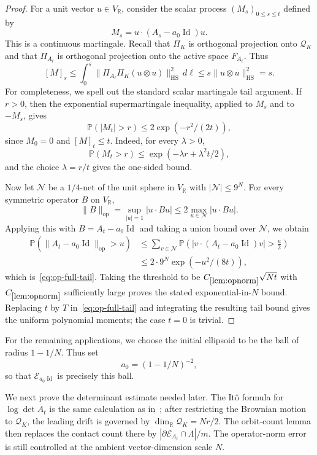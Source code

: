 \documentclass[11pt]{article}
\theoremstyle{remark}
\newcommand{\R}{\mathbb R}
\newcommand{\Id}{\operatorname{Id}}
\newcommand{\Prob}{\mathbb P}
\newcommand{\HS}{\operatorname{HS}}
\newcommand{\op}{\operatorname{op}}
\newcommand{\calE}{\mathcal E}
\begin{document}
\begin{proof}
For a unit vector $u\in V_\R$, consider the scalar process
$(M_s)_{0\le s\le t}$ defined by
\[
        M_s=u\cdot(A_s-a_0\Id)u.
\]
This is a continuous martingale.  Recall that $\Pi_K$ is orthogonal
projection onto $\mathcal Q_K$ and that $\Pi_{A_\ell}$ is orthogonal
projection onto the active space
$F_{A_\ell}$.  Thus
\[
        [M]_s
        \le \int_0^s\|\Pi_{A_\ell}\Pi_K(u\otimes u)\|_{\HS}^2\,d\ell
        \le s\|u\otimes u\|_{\HS}^2=s.
\]
For completeness, we spell out the standard scalar martingale tail argument.
If $r>0$, then the exponential supermartingale inequality, applied to $M_s$
and to $-M_s$, gives
\[
        \Prob(|M_t|>r)
        \le 2\exp\left(-r^2/(2t)\right),
\]
since $M_0=0$ and $[M]_t\le t$.  Indeed, for every $\lambda>0$,
\[
        \Prob(M_t>r)
        \le \exp\left(-\lambda r+\lambda^2t/2\right),
\]
and the choice $\lambda=r/t$ gives the one-sided bound.

Now let $\mathcal N$ be a $1/4$-net of the unit sphere in $V_\R$ with
$|\mathcal N|\le 9^N$.  For every symmetric operator $B$ on $V_\R$,
\[
        \|B\|_{\op}
        =\sup_{|u|=1}|u\cdot Bu|
        \le 2\max_{u\in\mathcal N}|u\cdot Bu|.
\]
Applying this with $B=A_t-a_0\Id$ and taking a union bound over $\mathcal N$,
we obtain
\[
\begin{aligned}
        \Prob\left(\|A_t-a_0\Id\|_{\op}>u\right)
        &\le
        \sum_{v\in\mathcal N}
        \Prob\left(\left|v\cdot(A_t-a_0\Id)v\right|>\frac{u}{2}\right) \\
        &\le 2\cdot 9^N
        \exp\left(-u^2/(8t)\right),
\end{aligned}
\]
which is~\eqref{eq:op-full-tail}.
Taking the threshold to be $C_{\ref{lem:opnorm}}\sqrt{Nt}$ with
$C_{\ref{lem:opnorm}}$ sufficiently large proves the stated
exponential-in-$N$ bound.  Replacing $t$ by $T$
in~\eqref{eq:op-full-tail} and integrating the resulting tail bound gives the
uniform polynomial moments; the case $t=0$ is trivial.
\end{proof}

For the remaining applications, we choose the initial ellipsoid to be the ball
of radius $1-1/N$.  Thus set
\begin{equation}
        a_0=(1-1/N)^{-2},
\label{eq:a0}
\end{equation}
so that $\calE_{a_0\Id}$ is precisely this ball.

We next prove the determinant estimate needed later.  The It\^o formula for
$\log\det A_t$ is the same calculation as in~\cite[Lemma~3.3]{Klartag}; after
restricting the Brownian motion to $\mathcal Q_K$, the leading drift
is governed by $\dim_\R\mathcal Q_K=Nr/2$.  The orbit-count lemma then
replaces the contact count there by
$|\partial\calE_{A_t}\cap\Lambda|/m$.  The operator-norm error is still
controlled at the ambient vector-dimension scale $N$.
\end{document}
